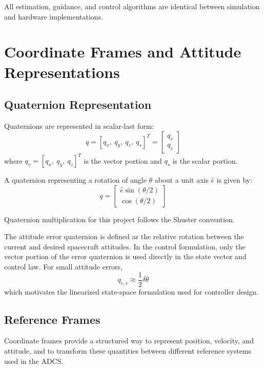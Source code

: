All estimation, guidance, and control algorithms are identical between simulation and hardware implementations.


\section{Coordinate Frames and Attitude Representations}

\subsection{Quaternion Representation}

Quaternions are represented in scalar-last form:
\[
q = [q_x,\ q_y,\ q_z,\ q_s]^T
=
\begin{bmatrix}
	q_v \\
	q_s
\end{bmatrix}
\]
where \(q_v = [q_x,\ q_y,\ q_z]^T\) is the vector portion and \(q_s\) is the scalar portion.

A quaternion representing a rotation of angle \(\theta\) about a unit axis \(\hat{e}\) is given by:
\[
q =
\begin{bmatrix}
	\hat{e}\sin(\theta/2) \\
	\cos(\theta/2)
\end{bmatrix}
\]

Quaternion multiplication for this project follows the Shuster convention.

The attitude error quaternion is defined as the relative rotation between the current and desired spacecraft attitudes. In the control formulation, only the vector portion of the error quaternion is used directly in the state vector and control law. For small attitude errors,
\[
q_{e,v} \approx \frac{1}{2}\delta\theta
\]
which motivates the linearized state-space formulation used for controller design.

\subsection{Reference Frames}

Coordinate frames provide a structured way to represent position, velocity, and attitude, and to transform these quantities between different reference systems used in the ADCS.

